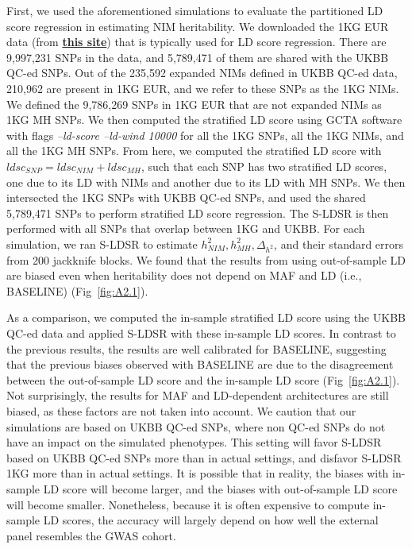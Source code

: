 First, we used the aforementioned simulations to evaluate the partitioned LD score regression in estimating NIM heritability. We downloaded the 1KG EUR data (from \hyperlink{https://storage.googleapis.com/broad-alkesgroup-public/LDSCORE/1000G_Phase3_plinkfiles.tgz}{\textbf{this site}}) that is typically used for LD score regression. There are 9,997,231 SNPs in the data, and 5,789,471 of them are shared with the UKBB QC-ed SNPs. Out of the 235,592 expanded NIMs defined in UKBB QC-ed data, 210,962 are present in 1KG EUR, and we refer to these SNPs as the 1KG NIMs. We defined the 9,786,269 SNPs in 1KG EUR that are not expanded NIMs as 1KG MH SNPs. We then computed the stratified LD score using GCTA software with flags \textit{--ld-score --ld-wind 10000} for all the 1KG SNPs, all the 1KG NIMs, and all the 1KG MH SNPs. From here, we computed the stratified LD score with $ldsc_{SNP} = ldsc_{NIM} + ldsc_{MH}$, such that each SNP has two stratified LD scores, one due to its LD with NIMs and another due to its LD with MH SNPs. We then intersected the 1KG SNPs with UKBB QC-ed SNPs, and used the shared 5,789,471 SNPs to perform stratified LD score regression. The S-LDSR is then performed with all SNPs that overlap between 1KG and UKBB. For each simulation, we ran S-LDSR to estimate $h_{NIM}^2, h_{MH}^2, \Delta_{h^2}$, and their standard errors from 200 jackknife blocks. We found that the results from using out-of-sample LD are biased even when heritability does not depend on  MAF and LD (i.e., BASELINE) (Fig~\ref{fig:A2.1}). 

As a comparison, we computed the in-sample stratified LD score using the UKBB QC-ed data and applied S-LDSR with these in-sample LD scores. In contrast to the previous results, the results are well calibrated for BASELINE, suggesting that the previous biases observed with BASELINE are due to the disagreement between the out-of-sample LD score and the in-sample LD score (Fig~\ref{fig:A2.1}). Not surprisingly, the results for MAF and LD-dependent architectures are still biased, as these factors are not taken into account. We caution that our simulations are based on UKBB QC-ed SNPs, where non QC-ed SNPs do not have an impact on the simulated phenotypes. This setting will favor S-LDSR based on UKBB QC-ed SNPs more than in actual settings, and disfavor S-LDSR 1KG more than in actual settings. It is possible that in reality, the biases with in-sample LD score will become larger, and the biases with out-of-sample LD score will become smaller. Nonetheless, because it is often expensive to compute in-sample LD scores, the accuracy will largely depend on how well the external panel resembles the GWAS cohort. 


